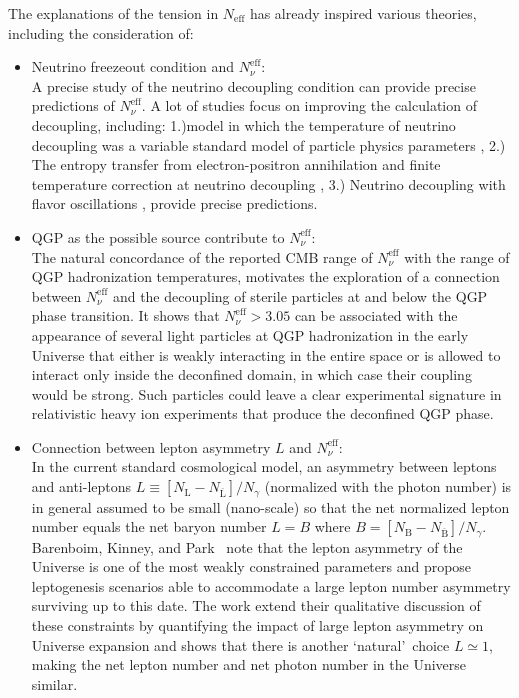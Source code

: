 \documentclass[universe,article,submit,moreauthors,pdftex,a4paper]{Definitions/mdpi}
\begin{document}
 The explanations of the tension in $N_\mathrm{eff}$ has already inspired various theories, including the consideration of:
\begin{itemize}
\item Neutrino freezeout condition and $N_\nu^{\mathrm{eff}}$:\\
A precise study of the neutrino decoupling condition can provide precise predictions of $N_\nu^{\mathrm{eff}}$. A lot of studies focus on improving the calculation of decoupling, including:
1.)model in which the temperature of neutrino decoupling was a variable standard model of particle physics parameters \cite{Birrell:2014uka}, 2.) The entropy transfer from electron-positron annihilation and finite temperature correction at neutrino decoupling \cite{Dicus:1982bz, Heckler:1994tv, Fornengo:1997wa}, 3.) Neutrino decoupling with flavor oscillations \cite{Mangano:2005cc,Mangano:2001iu}, provide precise predictions.


\item QGP as the possible source contribute to $N_\nu^{\mathrm{eff}}$:\\
The natural concordance of the reported CMB range of $N_\nu^{\mathrm{eff}}$ with the range of QGP hadronization temperatures, motivates the exploration of a connection between $N_\nu^{\mathrm{eff}}$ and the decoupling of sterile particles at and below the QGP phase transition\cite{Birrell:2014cja}. It shows that $N_\nu^{\mathrm{eff}}>3.05$ can be associated with the appearance of several light particles at QGP hadronization in the early Universe that either is weakly interacting in the entire space or is allowed to interact only inside the deconfined domain, in which case their coupling would be strong. Such particles could leave a clear experimental signature in relativistic heavy ion experiments that produce the deconfined QGP phase.

\item Connection between lepton asymmetry $L$ and $N_\nu^{\mathrm{eff}}$:\\
In the current standard cosmological model, an asymmetry between leptons and anti-leptons $L\equiv  [N_\mathrm{L}-N_{\overline{\mathrm{L}}}] /N_\gamma $  (normalized with the photon number) is in general assumed to be small (nano-scale) so that the net normalized lepton number equals the net baryon number $L=B$ where $B=[N_\mathrm{B}-N_{\overline{\mathrm{B}}}]/N_\gamma $. Barenboim, Kinney, and Park~\cite{Barenboim:2016shh,Barenboim:2017dfq}  note that the lepton asymmetry of the Universe is one of the most weakly constrained parameters and propose leptogenesis scenarios able to accommodate a large lepton number asymmetry surviving up to this date. The work \cite{Yang:2018oqg}  extend their qualitative discussion of these constraints by quantifying the impact of large lepton asymmetry on Universe expansion and shows that there is another \lq natural\rq\ choice  $L\simeq 1$, making the  net lepton number and net photon number in the Universe similar. 

\end{itemize}
\end{document}

